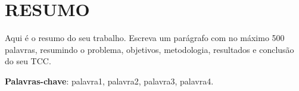 \chapter{RESUMO}


Aqui é o resumo do seu trabalho. Escreva um parágrafo com no máximo 500 palavras, resumindo o problema, objetivos, metodologia, resultados e conclusão do seu TCC.

\vspace{0.5cm}
\noindent \textbf{Palavras-chave}: palavra1, palavra2, palavra3, palavra4.